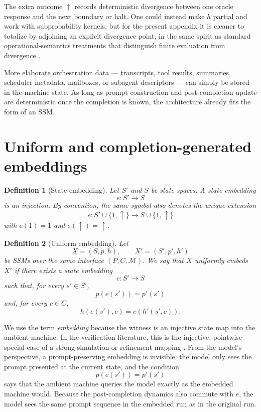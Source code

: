 \documentclass[11pt]{article}
\newtheorem{definition}{Definition}[section]
\begin{document}
The extra outcome $\uparrow$ records deterministic divergence between one oracle response and the next boundary or halt. One could instead make $h$ partial and work with subprobability kernels, but for the present appendix it is cleaner to totalize by adjoining an explicit divergence point, in the same spirit as standard operational-semantics treatments that distinguish finite evaluation from divergence \cite{LeroyGrall09}.

More elaborate orchestration data --- transcripts, tool results, summaries, scheduler metadata, mailboxes, or subagent descriptors --- can simply be stored in the machine state. As long as prompt construction and post-completion update are deterministic once the completion is known, the architecture already fits the form of an SSM.

\section{Uniform and completion-generated embeddings}

\begin{definition}[State embedding]
Let $S'$ and $S$ be state spaces. A \emph{state embedding}
\[
e:S'\to S
\]
is an injection. By convention, the same symbol also denotes the unique extension
\[
e:S'\cup\{1,\uparrow\}\to S\cup\{1,\uparrow\}
\]
with $e(1)=1$ and $e(\uparrow)=\uparrow$.
\end{definition}

\begin{definition}[Uniform embedding]\label{def:uniform-embedding}
Let
\[
X=(S,p,h),\qquad X'=(S',p',h')
\]
be SSMs over the same interface $(P,C,\mathcal{M})$. We say that $X$ \emph{uniformly embeds} $X'$ if there exists a state embedding
\[
e:S'\to S
\]
such that, for every $s'\in S'$,
\[
p(e(s'))=p'(s')
\]
and, for every $c\in C$,
\[
h(e(s'),c)=e(h'(s',c)).
\]
\end{definition}

We use the term \emph{embedding} because the witness is an injective state map into the ambient machine. In the verification literature, this is the injective, pointwise special case of a strong simulation or refinement mapping \cite{AbadiLamport91,LynchVaandrager95,SegalaLynch95}. From the model's perspective, a prompt-preserving embedding is invisible: the model only sees the prompt presented at the current state, and the condition
\[
p(e(s'))=p'(s')
\]
says that the ambient machine queries the model exactly as the embedded machine would. Because the post-completion dynamics also commute with $e$, the model sees the same prompt sequence in the embedded run as in the original run.
\end{document}
